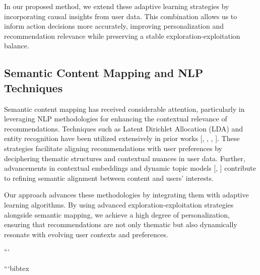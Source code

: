 In our proposed method, we extend these adaptive learning strategies by incorporating causal insights from user data. This combination allows us to inform action decisions more accurately, improving personalization and recommendation relevance while preserving a stable exploration-exploitation balance.

\subsection{Semantic Content Mapping and NLP Techniques}

Semantic content mapping has received considerable attention, particularly in leveraging NLP methodologies for enhancing the contextual relevance of recommendations. Techniques such as Latent Dirichlet Allocation (LDA) and entity recognition have been utilized extensively in prior works [\cite{Blei2003LDA}, \cite{Manning2014Stanford}, \cite{Pennington2014GloVe}, \cite{Devlin2019BERT}]. These strategies facilitate aligning recommendations with user preferences by deciphering thematic structures and contextual nuances in user data. Further, advancements in contextual embeddings and dynamic topic models [\cite{Liu2019Text}, \cite{Pang2008Opinion}] contribute to refining semantic alignment between content and users' interests.

Our approach advances these methodologies by integrating them with adaptive learning algorithms. By using advanced exploration-exploitation strategies alongside semantic mapping, we achieve a high degree of personalization, ensuring that recommendations are not only thematic but also dynamically resonate with evolving user contexts and preferences.

```

```bibtex
